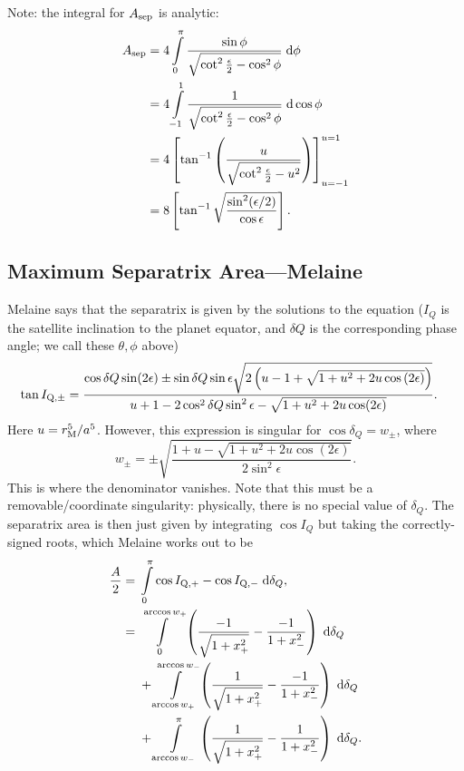 \documentclass[11pt,
        usenames, %
        dvipsnames %
    ]{article}
\newcommand*{\p}[1]{\left(#1\right)}
\newcommand*{\s}[1]{\left[#1\right]}
\begin{document}
Note: the integral for $A_{\rm sep}$ is analytic:
\begin{align}
    A_{\rm sep} &= 4\int\limits_0^\pi
            \frac{\sin\phi}{\sqrt{\cot^2\frac{\epsilon}{2} - \cos^2\phi}}
            \;\mathrm{d}\phi\nonumber\\
        &= 4\int\limits_{-1}^1
            \frac{1}{\sqrt{\cot^2\frac{\epsilon}{2} - \cos^2\phi}}
            \;\mathrm{d}\cos \phi\nonumber\\
        &= 4\s{\tan^{-1}\p{\frac{u}{
            \sqrt{\cot^2\frac{\epsilon}{2} - u^2}}}}_{u=-1}^{u=1}\nonumber\\
        &= 8\s{\tan^{-1}\sqrt{\frac{\sin^2(\epsilon / 2)}{\cos \epsilon}}}.
\end{align}

\subsection{Maximum Separatrix Area---Melaine}

Melaine says that the separatrix is given by the solutions to the equation
($I_Q$ is the satellite inclination to the planet equator, and $\delta Q$ is the
corresponding phase angle; we call these $\theta,\phi$ above)
\begin{align}
    \tan I_{\rm Q,\pm}
        &= \frac{\cos \delta Q \sin (2\epsilon) \pm \sin \delta Q
            \sin \epsilon\sqrt{2\p{u - 1 + \sqrt{1 + u^2 + 2u\cos\p{2\epsilon}}}}}{
            u + 1 - 2\cos^2 \delta Q \sin^2\epsilon - \sqrt{1 + u^2 +
            2u\cos(2\epsilon)}}.
\end{align}
Here $u = r_{\rm M}^5/a^5$.
However, this expression is singular for $\cos \delta_Q = w_{\pm}$, where
\begin{equation}
    w_{\pm} = \pm \sqrt{\frac{1 + u - \sqrt{1 + u^2 +
        2u\cos(2\epsilon)}}{2\sin^2\epsilon}}.
\end{equation}
This is where the denominator vanishes. Note that this must be a
removable/coordinate singularity: physically, there is no special value of
$\delta_Q$. The separatrix area is then just given by integrating $\cos I_Q$ but
taking the correctly-signed roots, which Melaine works out to be
\begin{align}
    \frac{A}{2} ={}&
            \int\limits_0^\pi \cos I_{\rm Q, +} - \cos I_{\rm Q,
            -}\;\mathrm{d}\delta_Q,\\
        ={}&
        \int\limits_0^{\arccos w_+}
            \p{\frac{-1}{\sqrt{1 + x_+^2}}
                - \frac{-1}{1 + x_-^2}}\;\mathrm{d}\delta_Q\nonumber\\
        &+ \int\limits_{\arccos w_+}^{\arccos w_-}
            \p{\frac{1}{\sqrt{1 + x_+^2}}
                - \frac{-1}{1 + x_-^2}}\;\mathrm{d}\delta_Q\nonumber\\
        &+ \int\limits_{\arccos w_-}^{\pi}
            \p{\frac{1}{\sqrt{1 + x_+^2}}
                - \frac{1}{1 + x_-^2}}\;\mathrm{d}\delta_Q.
\end{align}
\end{document}
